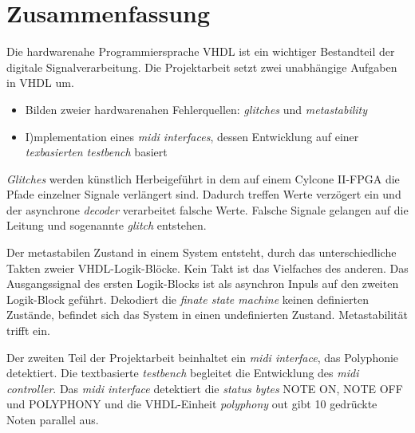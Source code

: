 
\chapter*{Zusammenfassung}


Die hardwarenahe Programmiersprache VHDL ist ein wichtiger Bestandteil der digitale Signalverarbeitung. Die Projektarbeit setzt zwei unabhängige Aufgaben in VHDL um.

\begin{itemize}
\item Bilden zweier hardwarenahen Fehlerquellen: \textit{glitches} und \textit{metastability}
	\item I)mplementation eines \textit{midi interfaces}, dessen Entwicklung auf einer \textit{texbasierten testbench} basiert
\end{itemize} 

 \textit{Glitches} werden künstlich Herbeigeführt in dem auf einem Cylcone II-FPGA die Pfade einzelner Signale verlängert sind. Dadurch treffen Werte verzögert ein und der asynchrone \textit{decoder} verarbeitet falsche Werte. Falsche Signale gelangen auf die Leitung und sogenannte \textit{glitch} entstehen. 

Der metastabilen Zustand in einem System entsteht, durch das unterschiedliche Takten zweier VHDL-Logik-Blöcke. Kein Takt ist das Vielfaches des anderen. Das Ausgangssignal des ersten Logik-Blocks ist als asynchron Inpuls auf den zweiten Logik-Block geführt. Dekodiert die \textit{finate state machine} keinen definierten Zustände, befindet sich das System in einen undefinierten Zustand. Metastabilität trifft ein.

Der zweiten Teil der Projektarbeit beinhaltet ein \textit{midi interface}, das Polyphonie detektiert. Die textbasierte \textit{testbench} begleitet die Entwicklung des \textit{midi controller}. Das \textit{midi interface} detektiert die \textit{status bytes} NOTE ON, NOTE OFF und POLYPHONY und die VHDL-Einheit \textit{polyphony} out gibt 10 gedrückte Noten parallel aus.
